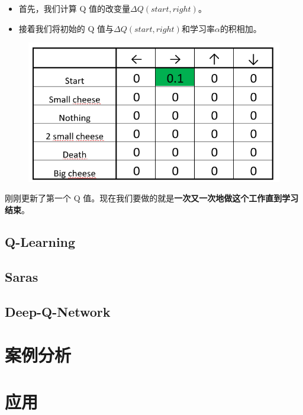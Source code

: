\documentclass[UTF8,a4paper,12pt]{ctexbook}
\begin{document}
				\begin{itemize}
					\item 首先，我们计算 Q 值的改变量$\Delta Q(start, right)$。
					\item 接着我们将初始的 Q 值与$\Delta Q(start, right)$和学习率$\alpha$的积相加。
				\end{itemize}
				
				\begin{figure}[H]
					\centering
					\includegraphics[width=.7\linewidth]{qExample06}
				\end{figure}
				
				刚刚更新了第一个 Q 值。现在我们要做的就是\textbf{一次又一次地做这个工作直到学习结束}。
				
						
	\section{Q-Learning}
	
	\section{Saras}
	
	\section{Deep-Q-Network}
		

\chapter{案例分析}


\chapter{应用}



  
		    
\end{document}
